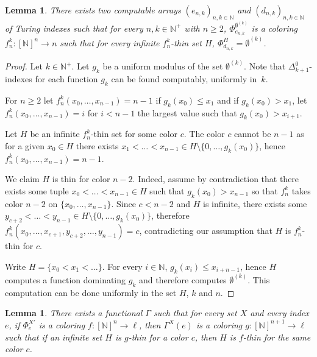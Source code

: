 \documentclass[10pt,a4paper]{article}
\newcommand{\NN}[0]{\mathbb{N}}
\numberwithin{theorem}{section}
\newtheorem{lemma}[theorem]{Lemma}
\begin{document}
\begin{lemma}\label{lem:arrays}
    There exists two computable arrays $(e_{n,k})_{n,k \in \NN}$ and $(d_{n,k})_{n,k \in \NN}$ of Turing indexes such that for every $n, k \in \NN^+$ with $n \geq 2$, $\Phi_{e_{n,k}}^{\emptyset^{(k)}}$ is a coloring $f_n^k : [\NN]^{n} \to n$ such that for every infinite $f_n^k$-thin set $H$, $\Phi_{d_{n,k}}^{H} = \emptyset^{(k)}$.
\end{lemma}

\begin{proof}
Let $k\in\NN^+$. Let $g_k$ be a uniform modulus of the set $\emptyset^{(k)}$. Note that $\Delta^0_{k+1}$-indexes for each function $g_k$ can be found computably, uniformly in~$k$. 

For $n \geq 2$ let $f_n^k(x_0, \dots,x_{n-1}) = n - 1$ if $g_k(x_0) \leq x_1$ and if $g_k(x_0) > x_1$, let $f_n^k(x_0, \dots,x_{n-1}) = i$ for $i < n - 1$ the largest value such that $g_k(x_0) > x_{i+1}$.

Let $H$ be an infinite $f_n^k$-thin set for some color $c$. The color $c$ cannot be $n-1$ as for a given $x_0 \in H$ there exists $x_1 <\dots < x_{n-1} \in H \setminus \{0, \dots, g_k(x_0)\}$, hence $f^k_n(x_0, \dots, x_{n-1}) = n-1$.

We claim $H$ is thin for color $n-2$. Indeed, assume by contradiction that there exists some tuple $x_0 < \dots < x_{n-1} \in H$ such that $g_k(x_0) > x_{n-1}$ so that $f^k_n$ takes color $n-2$ on $\{x_0, \dots, x_{n-1}\}$. Since $c < n-2$ and $H$ is infinite, there exists some $y_{c+2}< \dots < y_{n-1} \in H \setminus \{0, \dots ,g_k(x_0)\}$, therefore $f^k_n(x_0, \dots, x_{c+1},y_{c+2}, \dots, y_{n-1}) = c$, contradicting our assumption that $H$ is $f_n^k$-thin for $c$.

Write $H = \{x_0 < x_1 < \dots \}$. For every $i \in \NN$, $g_k(x_i) \leq x_{i + n - 1}$, hence $H$ computes a function dominating $g_k$ and therefore computes $\emptyset^{(k)}$. This computation can be done uniformly in the set $H$, $k$ and $n$. 
\end{proof}

\begin{lemma}
    There exists a functional $\Gamma$ such that for every set $X$ and every index $e$, if $\Phi_e^{X'}$ is a coloring $f : [\NN]^n \to \ell$, then $\Gamma^X(e)$ is a coloring $g : [\NN]^{n+1} \to \ell$ such that if an infinite set $H$ is $g$-thin for a color $c$, then $H$ is $f$-thin for the same color $c$. 
\end{lemma}
\end{document}

